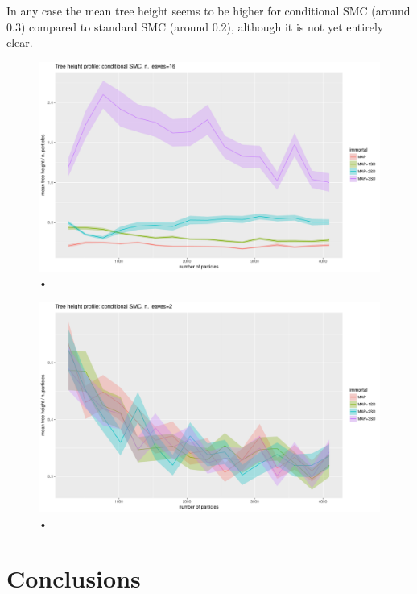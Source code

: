 \documentclass{article}
\begin{document}
In any case the mean tree height seems to be higher for conditional SMC (around 0.3) compared to standard SMC (around 0.2), although it is not yet entirely clear.

\begin{figure}
\centering
\includegraphics[width=\textwidth]{kalman_n16_100reps_line.pdf}
\caption{•}
\label{fig:kalman_n16}
\end{figure}
\begin{figure}
\centering
\includegraphics[width=\textwidth]{kalman_n2_1000reps_line.pdf}
\caption{•}
\label{fig:kalman_n2}
\end{figure}

\section{Conclusions}


\end{document}
